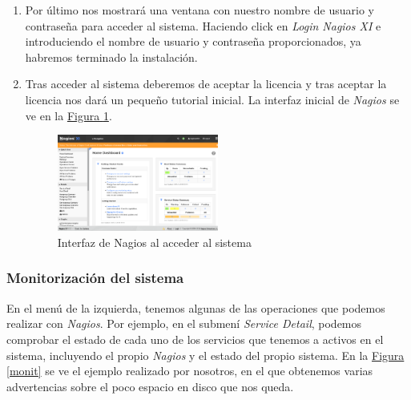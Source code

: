 \documentclass[10pt,a4paper,spanish]{article}
\numberwithin{equation}{section} %
\numberwithin{figure}{section} %
\numberwithin{table}{section} %
\begin{document}
\begin{enumerate}[1.]
    \item Por último nos mostrará una ventana con nuestro nombre de usuario y contraseña para acceder al sistema. Haciendo click en \textit{Login Nagios XI} e introduciendo el nombre de usuario y contraseña proporcionados, ya habremos terminado la instalación.

    \item Tras acceder al sistema deberemos de aceptar la licencia y tras aceptar la licencia nos dará un pequeño tutorial inicial. La interfaz inicial de \textit{Nagios} se ve en la \hyperref[interfaznagios]{Figura \ref*{interfaznagios}}.

    \begin{figure}[!h]
        \centering
        \includegraphics[width=0.5\textwidth]{31}
        \caption{Interfaz de Nagios al acceder al sistema}
        \label{interfaznagios}
    \end{figure}
\end{enumerate}

\subsubsection{Monitorización del sistema}
En el menú de la izquierda, tenemos algunas de las operaciones que podemos realizar con \textit{Nagios}. Por ejemplo, en el submení \textit{Service Detail}, podemos comprobar el estado de cada uno de los servicios que tenemos a activos en el sistema, incluyendo el propio \textit{Nagios} y el estado del propio sistema. En la \hyperref[monit]{Figura \ref*{monit}} se ve el ejemplo realizado por nosotros, en el que obtenemos varias advertencias sobre el poco espacio en disco que nos queda.
\end{document}

